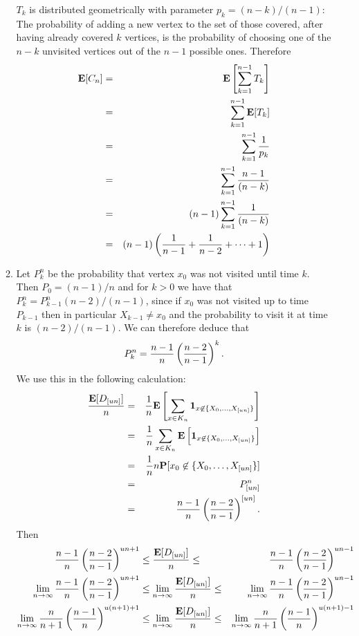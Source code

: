 \documentclass[11pt]{article} \usepackage{amssymb}
\newcommand{\E}{{\bf E}} \newcommand{\Cov}{{\bf Cov}}
\begin{document}
\begin{enumerate}
\begin{enumerate}
      $T_k$ is distributed geometrically with parameter 
      $p_k=(n-k)/(n-1)$: The
      probability of adding a new vertex to the set of those covered, after 
      having already covered $k$ vertices, is the probability of choosing
      one of the $n-k$ unvisited vertices out of the $n-1$ possible ones. 
      Therefore
      \begin{eqnarray*}
        \E[C_n]&=&\E\left[\sum_{k=1}^{n-1}T_k\right]
        \\ &=&\sum_{k=1}^{n-1}\E[T_k]
        \\ &=&\sum_{k=1}^{n-1}{1\over p_k}
        \\ &=&\sum_{k=1}^{n-1}{n-1\over (n-k)}
        \\ &=&(n-1)\sum_{k=1}^{n-1}{1\over (n-k)}
        \\ &=& (n-1)\left({1\over n-1}+{1\over n-2}+\cdots+1\right)
      \end{eqnarray*}
    \item
      Let $P_k^n$ be the probability that vertex $x_0$ was not visited until
      time $k$. Then $P_0=(n-1)/n$ and for $k>0$ we have that 
      $P_k^n=P_{k-1}^n(n-2)/(n-1)$, since if $x_0$ was not visited up to time 
      $P_{k-1}$ then in particular $X_{k-1}\neq x_0$ and the probability to visit
      it at time $k$ is $(n-2)/(n-1)$. We can therefore deduce that
      $$P_k^n={n-1\over n}\left({n-2\over n-1}\right)^k.$$
      We use this in the  following calculation:
      \begin{eqnarray*}
        {\E[D_{[un]}]\over n} &=& {1\over n}\E\left[\sum_{x\in K_n}{\bf 1}_{x \not \in \{X_0,\ldots,X_{[un]}\}}\right]
        \\ &=& {1\over n}\sum_{x\in K_n}\E\left[{\bf 1}_{x \not \in \{X_0,\ldots,X_{[un]}\}}\right]
        \\ &=& {1\over n}n\P[x_0 \not \in \{X_0,\ldots,X_{[un]}\}]
        \\ &=& P_{[un]}^n
        \\ &=& {n-1\over n}\left({n-2\over n-1}\right)^{[un]}.
        \end{eqnarray*}
        Then
        \begin{eqnarray*}
          {n-1\over n}\left({n-2\over n-1}\right)^{un+1} &\leq {\E[D_{[un]}]\over n} \leq& {n-1\over n}\left({n-2\over n-1}\right)^{un-1}
          \\ \lim_{n \to \infty}{n-1\over n}\left({n-2\over n-1}\right)^{un+1} &\leq \lim_{n \to \infty}{\E[D_{[un]}]\over n} \leq& \lim_{n \to \infty}{n-1\over n}\left({n-2\over n-1}\right)^{un-1}
          \\ \lim_{n \to \infty}{n\over n+1}\left({n-1\over n}\right)^{u(n+1)+1} &\leq \lim_{n \to \infty}{\E[D_{[un]}]\over n} \leq& \lim_{n \to \infty}{n\over n+1}\left({n-1\over n}\right)^{u(n+1)-1}

\end{eqnarray*}
\end{enumerate}
\end{enumerate}
\end{document}
